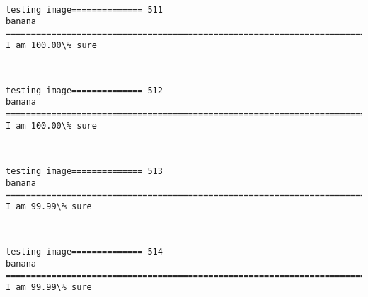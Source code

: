 \documentclass[11pt]{article}
\begin{document}
    \begin{center}
    \end{center}
    { \hspace*{\fill} \\}
    
    \begin{Verbatim}[commandchars=\\\{\}]
testing image============== 511
banana
============================================================================
I am 100.00\% sure

    \end{Verbatim}

    \begin{center}
    \end{center}
    { \hspace*{\fill} \\}
    
    \begin{Verbatim}[commandchars=\\\{\}]
testing image============== 512
banana
============================================================================
I am 100.00\% sure

    \end{Verbatim}

    \begin{center}
    \end{center}
    { \hspace*{\fill} \\}
    
    \begin{Verbatim}[commandchars=\\\{\}]
testing image============== 513
banana
============================================================================
I am 99.99\% sure

    \end{Verbatim}

    \begin{center}
    \end{center}
    { \hspace*{\fill} \\}
    
    \begin{Verbatim}[commandchars=\\\{\}]
testing image============== 514
banana
============================================================================
I am 99.99\% sure

    \end{Verbatim}
\end{document}

